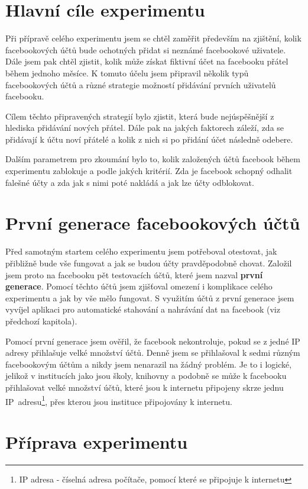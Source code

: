 \documentclass[thesis=M,czech]{FITthesis}[2013/05/10]
\begin{document}
\section{Hlavní cíle experimentu}

Při přípravě celého experimentu jsem se chtěl zaměřit především na zjištění, kolik facebookových účtů bude ochotných přidat si neznámé facebookové uživatele. Dále jsem pak chtěl zjistit, kolik může získat fiktivní účet na facebooku přátel během jednoho měsíce. K tomuto účelu jsem připravil několik typů facebookových účtů a různé strategie možností přidávání prvních uživatelů facebooku.

Cílem těchto připravených strategií bylo zjistit, která bude nejúspěšnější z hlediska přidávání nových přátel. Dále pak na jakých faktorech záleží, zda se přidávají k účtu noví přátelé a kolik z nich si po přidání účet následně odebere.

Dalším parametrem pro zkoumání bylo to, kolik založených účtů facebook během experimentu zablokuje a podle jakých kritérií. Zda je facebook schopný odhalit falešné účty a zda jak s nimi poté nakládá a jak lze účty odblokovat.


\section{První generace facebookových účtů}

Před samotným startem celého experimentu jsem potřeboval otestovat, jak přibližně bude vše fungovat a jak se budou účty pravděpodobně chovat. Založil jsem proto na facebooku pět testovacích účtů, které jsem nazval \textbf{první generace}. Pomocí těchto účtů jsem zjišťoval omezení i komplikace celého experimentu a jak by vše mělo fungovat. S využitím účtů z první generace jsem vyvíjel aplikaci pro automatické stahování a nahrávání dat na facebook (viz předchozí kapitola).

Pomocí první generace jsem ověřil, že facebook nekontroluje, pokud se z jedné IP adresy přihlašuje velké množství účtů. Denně jsem se přihlašoval k sedmi různým facebookovým účtům a nikdy jsem nenarazil na žádný problém. Je to i logické, jelikož v institucích jako jsou školy, knihovny a podobně se může k facebooku přihlašovat velké množství účtů, které jsou k internetu připojeny skrze jednu IP~adresu\footnote{IP adresa - číselná adresa počítače, pomocí které se připojuje k internetu}, přes kterou jsou instituce připojovány k internetu.

\section{Příprava experimentu}
\end{document}
